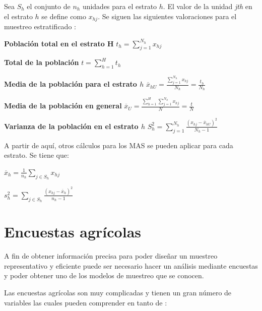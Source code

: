 \documentclass{report}
\begin{document}
Sea $S_h$ el conjunto de $n_h$ unidades para el estrato $h$. El valor de la unidad \textit{jth} en el estrato $h$ se define como $x_{hj}$. Se siguen las siguientes valoraciones para el muestreo estratificado \cite{lohr-2009}:

\bigbreak

\textbf{Población total en el estrato H}
\bigbreak
$t_h = \sum_{j=1}^{N_h} x_{hj}$


\bigbreak

\textbf{Total de la población}
\bigbreak
$t = \sum_{h=1}^H t_h$


\bigbreak

\textbf{Media de la población para el estrato $h$}
\bigbreak
$\overline{x}_{hU} = \frac{\sum_{j=1}^{N_h} x_{hj}}{N_h} = \frac{t_h}{N_h}$


\bigbreak

\textbf{Media de la población en general}
\bigbreak
$\overline{x}_U = \frac{\sum_{h=1}^H \sum_{j=1}^{N_h} x_{hj}}{N} = \frac{t}{N}$


\bigbreak

\textbf{Varianza de la población en el estrato $h$}
\bigbreak
$S_h^2 = \sum_{j=1}^{N_h} \frac{(x_{hj} - \overline{x}_{hU})^2}{N_h - 1}$


\bigbreak

A partir de aquí, otros cálculos para los MAS se pueden aplicar para cada estrato. Se tiene que:

\bigbreak

$\overline{x}_h = \frac{1}{n_h} \sum_{j \in S_h} x_{hj}$

\bigbreak

$s^2_h = \sum_{j \in S_h} \frac{(x_{hj} - \overline{x}_h)^2}{n_h - 1}$

\section{Encuestas agrícolas}

A fin de obtener información precisa para poder diseñar un muestreo representativo y eficiente puede ser necesario hacer un análisis mediante encuestas y poder obtener uno de los modelos de muestreo que se conocen.

\bigbreak

Las encuestas agrícolas son muy complicadas y tienen un gran número de variables las cuales pueden comprender en tanto de \cite{organizacion-de-las-naciones-unidas-para-la-agricultura-y-la-alimentacion-1990}:
\end{document}
